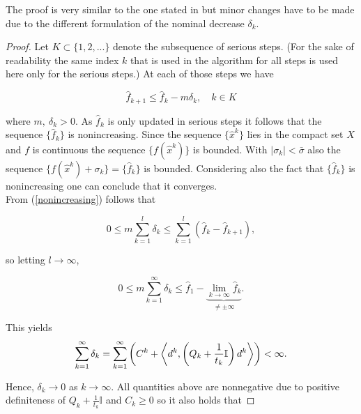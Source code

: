 The proof is very similar to the one stated in \cite{Hare2016} but minor changes have to be made due to the different formulation of the nominal decrease \(\delta_k\).

\begin{proof}
	Let \(K \subset \{1,2,...\}\) denote the subsequence of serious steps. (For the sake of readability the same index \(k\) that is used in the algorithm for all steps is used here only for the serious steps.)
	At each of those steps we have
	
	\begin{equation}
		\hat{f}_{k+1} \leq \hat{f}_k - m\delta_{k}, \quad {k} \in {K} 
	\label{nonincreasing}
	\end{equation}
	
	where \(m, ~\delta_{k} > 0\). 
	As \(\hat{f}_k\) is only updated in serious steps it follows that the sequence \(\{\hat{f}_k\}\) is nonincreasing.
	Since the sequence \(\{\hat{x}^k\}\) lies in the compact set \(X\) and \(f\) is continuous the sequence \(\{f(\hat{x}^k)\}\) is bounded. %
	With \(|\sigma_k| < \bar{\sigma}\) also the sequence \(\{f(\hat{x}^k)+\sigma_k\} = \{\hat{f}_k\}\) is bounded. Considering also the fact that \(\{\hat{f}_k\}\) is nonincreasing one can conclude that it converges. \\
	From (\ref{nonincreasing}) follows that
	
	\begin{equation*}
		0 \leq m \sum_{k = 1}^l \delta_k \leq \sum_{k = 1}^l \left(\hat{f}_k-\hat{f}_{k+1}\right),
	\end{equation*}
	
	so letting \(l \to \infty\), 
	
	\begin{equation*}
		0 \leq m\sum_{k=1}^{\infty} \delta_k \leq \hat{f}_1 - \underbrace{\lim_{k \to \infty} \hat{f}_k}_{\neq \pm \infty}.
	\end{equation*}
	
	This yields
	\begin{equation*}
		\sum_{k = 1}^{\infty} \delta_k = \sum_{k=1}^{\infty}\left(C^k+\left\langle d^k,\left(Q_k+\frac{1}{t_k}\mathbb{I}\right)d^k\right\rangle \right) < \infty.
	\end{equation*}
	
	Hence, \(\delta_k \to 0\) as \(k \to \infty\). All quantities above are nonnegative due to positive definiteness of \(Q_k+\frac{1}{t_k}\mathbb{I}\) and \(C_k \geq 0\) so it also holds that
	

\end{proof}
